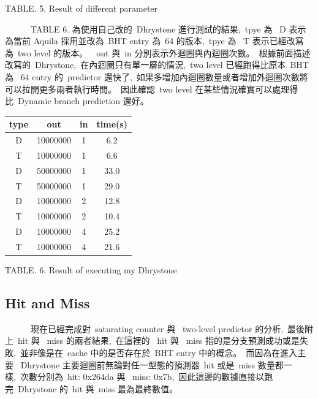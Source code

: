 \documentclass{article}
\begin{document}
\begin{CJK*}{UTF8}{bsmi}
\begin{multicols}{2}
\begin{center}
    \footnotesize TABLE. 5. Result of different parameter
\end{center}

\begin{flushleft}
    \ \ \ \ \ \ TABLE 6. 為使用自己改的\ Dhrystone 進行測試的結果,\
    tpye 為 \ D 表示為當前 Aquila 採用並改為\ BHT entry 為\ 64 的版本,\
    tpye 為 \ T 表示已經改寫為\ two level 的版本。\
    \ out 與\ in 分別表示外迴圈與內迴圈次數。\
    根據前面描述改寫的\ Dhrystone,\
    在內迴圈只有單一層的情況,\
    two level 已經跑得比原本\ BHT 為 \ 64 entry 的\ predictor 還快了,\
    如果多增加內迴圈數量或者增加外迴圈次數將可以拉開更多兩者執行時間。\
    因此確認\ two level 在某些情況確實可以處理得比\ Dynamic branch prediction 還好。
\end{flushleft}

\begin{center}
    \begin{tabular}{||c c c c ||} 
        \hline
        type & out & in & time(s)   \\ [1.0ex] 
        \hline\hline
        D & 10000000 & 1 & 6.2  \\ 
        \hline
        T & 10000000 & 1 & 6.6  \\ 
        \hline
        D & 50000000 & 1 & 33.0  \\ 
        \hline
        T & 50000000 & 1 & 29.0  \\ 
        \hline
        D & 10000000 & 2 & 12.8  \\ 
        \hline
        T & 10000000 & 2 & 10.4 \\ 
        \hline
        D & 10000000 & 4 & 25.2  \\ 
        \hline
        T & 10000000 & 4 & 21.6 \\ 
        \hline
    \end{tabular}
\end{center}
\begin{center}
    \footnotesize TABLE. 6. Result of executing my Dhrystone
\end{center}

\newpage

\begin{center}
    \section*{Hit and Miss}
\end{center}

\begin{flushleft}
    \ \ \ \ \ \ 現在已經完成對\ saturating counter 與 \ two-level predictor 的分析,\
    最後附上\ hit 與 \ miss 的兩者結果,\ 
    在這裡的 \ hit 與 \ miss 指的是分支預測成功或是失敗,\
    並非像是在\ cache 中的是否存在於\ BHT entry 中的概念。\
    而因為在進入主要 \ Dhrystone 主要迴圈前無論對任一型態的預測器\ hit 或是\ miss 數量都一樣,\
    次數分別為\ hit: 0x264da 與 \ miss: 0x7b,\
    因此這邊的數據直接以跑完\ Dhrystone 的\ hit 與\ miss 最為最終數值。\


\end{flushleft}
\end{multicols}
\end{CJK*}
\end{document}
